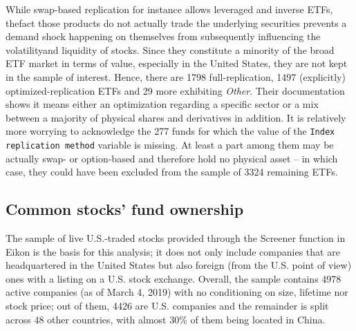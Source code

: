 While swap-based replication for instance allows leveraged and inverse ETFs, thefact those products do not actually trade the underlying securities prevents a demand shock happening on themselves from subsequently influencing the volatilityand liquidity of stocks. Since they constitute a minority of the broad ETF market in terms of value, especially in the United States, they are not kept in the sample of interest. Hence, there are 1798 full-replication, 1497 (explicitly) optimized-replication ETFs and 29 more exhibiting \textit{Other}. Their documentation shows it means either an optimization regarding a specific sector or a mix between a majority of physical shares and derivatives in addition. It is relatively more worrying to acknowledge the 277 funds for which the value of the \texttt{Index replication method} variable is missing. At least a part among them may be actually swap- or option-based and therefore hold no physical asset -- in which case, they could have been excluded from the sample of 3324 remaining ETFs.



\subsection{Common stocks' fund ownership}
The sample of live U.S.-traded stocks provided through the Screener function in Eikon is the basis for this analysis; it does not only include companies that are headquartered in the United States but also foreign (from the U.S. point of view) ones with a listing on a U.S. stock exchange. Overall, the sample contains 4978 active companies (as of March 4, 2019) with no conditioning on size, lifetime nor stock price; out of them, 4426 are U.S. companies and the remainder is split across 48 other countries, with almost 30\% of them being located in China.

